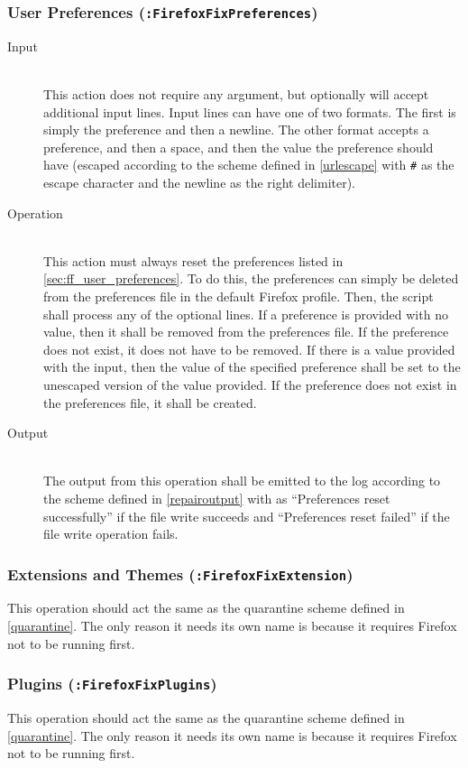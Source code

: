 \subsubsection{User Preferences (\texttt{:FirefoxFixPreferences})}
\begin{description}
\item[Input] \hfill \\
This action does not require any argument, but optionally will accept additional
input lines.  Input lines can have one of two formats.  The first is simply the
preference and then a newline.  The other format accepts a preference, and then
a space, and then the value the preference should have (escaped according to
the scheme defined in \ref{urlescape} with \verb|#| as the escape character and
the newline as the right delimiter). 
\item[Operation] \hfill \\
This action must always reset the preferences listed in
\ref{sec:ff_user_preferences}.  To do this, the preferences can simply be
deleted from the preferences file in the default Firefox profile.  Then, the
script shall process any of the optional lines.  If a preference is provided
with no value, then it shall be removed from the preferences file.  If the
preference does not exist, it does not have to be removed.  If there is a value
provided with the input, then the value of the specified preference shall be
set to the unescaped version of the value provided.  If the preference does not
exist in the preferences file, it shall be created.
\item[Output] \hfill \\
The output from this operation shall be emitted to the log according to the
scheme defined in \ref{repairoutput} with  as ``Preferences reset
successfully'' if the file write succeeds and ``Preferences reset failed'' if
the file write operation fails.
\end{description}

\subsubsection{Extensions and Themes (\texttt{:FirefoxFixExtension})}
This operation should act the same as the quarantine scheme
defined in \ref{quarantine}. The only reason it needs its own name is because it
requires Firefox not to be running first.

\subsubsection{Plugins (\texttt{:FirefoxFixPlugins})}
This operation should act the same as the quarantine scheme
defined in \ref{quarantine}. The only reason it needs its own name is because it
requires Firefox not to be running first.

